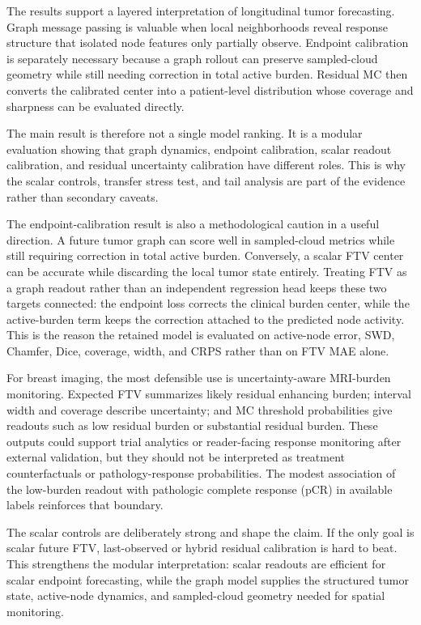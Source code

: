 \documentclass[journal,twoside,print]{ieeecolor}
\begin{document}
The results support a layered interpretation of longitudinal tumor forecasting.
Graph message passing is valuable when local neighborhoods reveal response
structure that isolated node features only partially observe. Endpoint
calibration is separately necessary because a graph rollout can preserve
sampled-cloud geometry while still needing correction in total active burden.
Residual MC then converts the calibrated center into a patient-level
distribution whose coverage and sharpness can be evaluated directly.

The main result is therefore not a single model ranking. It is a modular
evaluation showing that graph dynamics, endpoint calibration, scalar readout
calibration, and residual uncertainty calibration have different roles. This
is why the scalar controls, transfer stress test, and tail analysis are part of
the evidence rather than secondary caveats.

The endpoint-calibration result is also a methodological caution in a useful
direction. A future tumor graph can score well in sampled-cloud metrics while
still requiring correction in total active burden. Conversely, a scalar FTV
center can be accurate while discarding the local tumor state entirely. Treating
FTV as a graph readout rather than an independent regression head keeps these
two targets connected: the endpoint loss corrects the clinical burden center,
while the active-burden term keeps the correction attached to the predicted node
activity. This is the reason the retained model is evaluated on active-node
error, SWD, Chamfer, Dice, coverage, width, and CRPS rather than on FTV MAE
alone.

For breast imaging, the most defensible use is uncertainty-aware MRI-burden
monitoring. Expected FTV summarizes likely residual enhancing burden; interval
width and coverage describe uncertainty; and MC threshold probabilities give
readouts such as low residual burden or substantial residual burden. These
outputs could support trial analytics or reader-facing response monitoring
after external validation, but they should not be interpreted as treatment
counterfactuals or pathology-response probabilities. The modest association of
the low-burden readout with pathologic complete response (pCR) in available
labels reinforces that boundary.

The scalar controls are deliberately strong and shape the claim. If the only
goal is scalar future FTV, last-observed or hybrid residual calibration is hard
to beat. This strengthens the modular interpretation: scalar readouts are
efficient for scalar endpoint forecasting, while the graph model supplies the
structured tumor state, active-node dynamics, and sampled-cloud geometry needed
for spatial monitoring.
\end{document}
